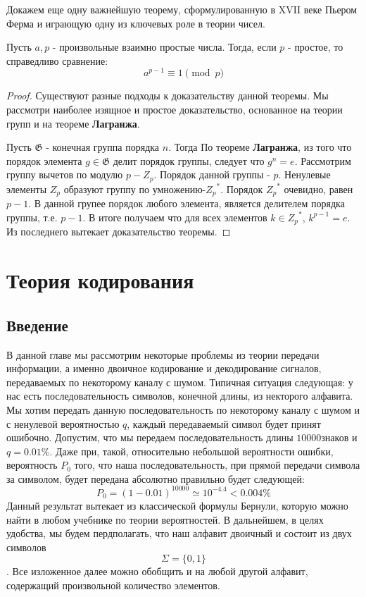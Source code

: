 Докажем еще одну важнейшую теорему, сформулированную в XVII веке Пьером Ферма и играющую одну из ключевых роле в теории чисел.
\begin{Thr}
Пусть $a,p$ - произвольные взаимно простые числа. Тогда, если $p$ - простое, то справедливо сравнение:
\begin{equation} \label{mPherma}
a^{p-1}\equiv 1 \pmod p
\end{equation}

\end{Thr}
\begin{proof}
Существуют разные подходы к доказательству данной теоремы. Мы рассмотри наиболее изящное и простое доказательство, основанное на теории групп и на теореме \textbf{Лагранжа}.

Пусть $\mathfrak{G}$ - конечная группа порядка $n$. Тогда По теореме \textbf{Лагранжа}, из того что порядок элемента $g \in \mathfrak{G}$ делит порядок группы, следует что $g^n=e$.
Рассмотрим группу вычетов по модулю $ p- Z_p $. Порядок данной группы - $p$. Ненулевые элементы $Z_p$ образуют группу по умножению-${Z_p}^*.$
Порядок ${Z_p}^*$ очевидно, равен $p-1$. В данной групее порядок любого элемента, является делителем порядка группы, т.е. $p-1$. В итоге получаем что для всех элементов $k \in {Z_p}^*$,
$k^{p-1}=e$. Из последнего вытекает доказательство теоремы.

\end{proof}

\chapter{Теория кодирования}
\section*{Введение}
В данной главе мы рассмотрим некоторые проблемы из теории передачи информации, а именно двоичное кодирование и декодирование сигналов, передаваемых по некоторому каналу с шумом.
Типичная ситуация следующая: у нас есть последовательность символов, конечной длины, из некторого алфавита. Мы хотим передать данную последовательность по некоторому каналу с шумом и с ненулевой вероятностью $q$, каждый передаваемый символ будет принят ошибочно. Допустим, что мы передаем последовательность длины $ 10000 $знаков и $q=0.01\% $. Даже при, такой, относительно небольшой вероятности ошибки, вероятность $ P_0 $ того, что наша последовательность, при прямой передачи символа за символом, будет передана абсолютно правильно будет следующей: 
$$P_0=(1-0.01)^{10000}\simeq 10^{-4.4}<0.004\% $$   
Данный результат вытекает из классической формулы Бернули, которую можно найти в любом учебнике по теории вероятностей.
В дальнейшем, в целях удобства, мы будем пердполагать, что наш алфавит двоичный и состоит из двух символов $$\Sigma=\{0,1\}$$.
Все изложенное далее можно обобщить и на любой другой алфавит, содержащий произвольной количество элементов.
